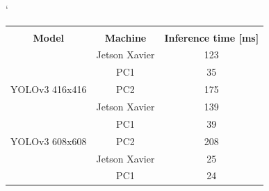 \documentclass[twoside]{ctuthesis}
\theoremstyle{plain}
\theoremstyle{definition}
\theoremstyle{note}
\begin{document}
\begin{table}[hbt]
\catcode`
\begin{tabular}{|c|c|c|}
\hline
\cellcolor[HTML]{C0C0C0}                                 & \cellcolor[HTML]{C0C0C0}                                   & \cellcolor[HTML]{C0C0C0}                                                   \\
\multirow{-2}{*}{\cellcolor[HTML]{C0C0C0}\textbf{Model}} & \multirow{-2}{*}{\cellcolor[HTML]{C0C0C0}\textbf{Machine}} & \multirow{-2}{*}{\cellcolor[HTML]{C0C0C0}\textbf{Inference time {[}ms{]}}} \\ \hline
                                                         & Jetson Xavier                                              & 123                                                                        \\ \cline{2-3} 
                                                         & PC1                                                        & 35                                                                         \\ \cline{2-3} 
\multirow{-3}{*}{YOLOv3 416x416}                         & PC2                                                        & 175                                                                        \\ \hline
                                                         & Jetson Xavier                                              & 139                                                                        \\ \cline{2-3} 
                                                         & PC1                                                        & 39                                                                         \\ \cline{2-3} 
\multirow{-3}{*}{YOLOv3 608x608}                         & PC2                                                        & 208                                                                        \\ \hline
                                                         & Jetson Xavier                                              & 25                                                                         \\ \cline{2-3} 
                                                         & PC1                                                        & 24                                                                         \\ \cline{2-3} 

\end{tabular}
\end{table}
\end{document}
